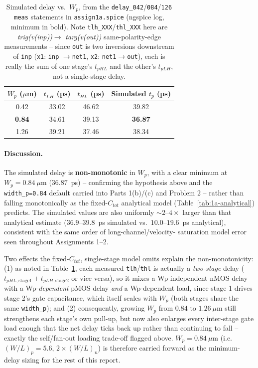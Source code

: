 \begin{table}[h]
  \centering
  \begin{tabular}{|c|c|c|c|}
    \hline
    $W_p$ ($\mu$m) & $t_{LH}$ (ps) & $t_{HL}$ (ps) & Simulated $t_p$ (ps) \\
    \hline
    0.42 & 33.02 & 46.62 & 39.82 \\
    \textbf{0.84} & 34.61 & 39.13 & \textbf{36.87} \\
    1.26 & 39.21 & 37.46 & 38.34 \\
    \hline
  \end{tabular}
  \caption{Simulated delay vs.\ $W_p$, from the
  \texttt{delay\_042}/\texttt{084}/\texttt{126} \texttt{meas} statements in
  \texttt{assign1a.spice} (ngspice log, minimum in bold). Note
  \texttt{tlh\_XXX}/\texttt{thl\_XXX} here are \emph{trig(v(inp))}$\to$
  \emph{targ(v(out))} same-polarity-edge measurements -- since \texttt{out} is
  two inversions downstream of \texttt{inp} (\texttt{x1}: \texttt{inp}
  $\to$\texttt{net1}, \texttt{x2}: \texttt{net1}$\to$\texttt{out}), each is
  really the sum of one stage's $t_{pHL}$ and the other's $t_{pLH}$, not a
  single-stage delay.}
  \label{tab:1a-sim}
\end{table}

\paragraph{Discussion.} The simulated delay is \textbf{non-monotonic} in
$W_p$, with a clear minimum at $W_p=0.84\ \mu\text{m}$ ($36.87$~ps) --
confirming the hypothesis above and the \texttt{width\_p=0.84} default carried
into Parts 1(b)/(c) and Problem 2 -- rather than falling monotonically as the
fixed-$C_{tot}$ analytical model (Table~\ref{tab:1a-analytical}) predicts. The
simulated values are also uniformly $\sim2$--$4\times$ larger than that
analytical estimate ($36.9$--$39.8$~ps simulated vs.\ $10.0$--$19.6$~ps
analytical), consistent with the same order of long-channel/velocity-
saturation model error seen throughout Assignments 1--2.

Two effects the fixed-$C_{tot}$, single-stage model omits explain the
non-monotonicity: (1) as noted in Table~\ref{tab:1a-sim}, each measured
\texttt{tlh}/\texttt{thl} is actually a \emph{two-stage} delay
($t_{pHL,\text{stage1}}+t_{pLH,\text{stage2}}$ or vice versa), so it mixes a
Wp-independent nMOS delay with a Wp-\emph{dependent} pMOS delay \emph{and} a
Wp-dependent load, since stage 1 drives stage 2's gate capacitance, which
itself scales with $W_p$ (both stages share the same \texttt{width\_p}); and
(2) consequently, growing $W_p$ from $0.84$ to $1.26\ \mu\text{m}$ still
strengthens each stage's own pull-up, but now also enlarges every
inter-stage gate load enough that the net delay ticks back up rather than
continuing to fall -- exactly the self/fan-out loading trade-off flagged
above. $W_p=0.84\ \mu\text{m}$ (i.e.\ $(W/L)_p=5.6$, $2\times(W/L)_n$) is
therefore carried forward as the minimum-delay sizing for the rest of this
report.

